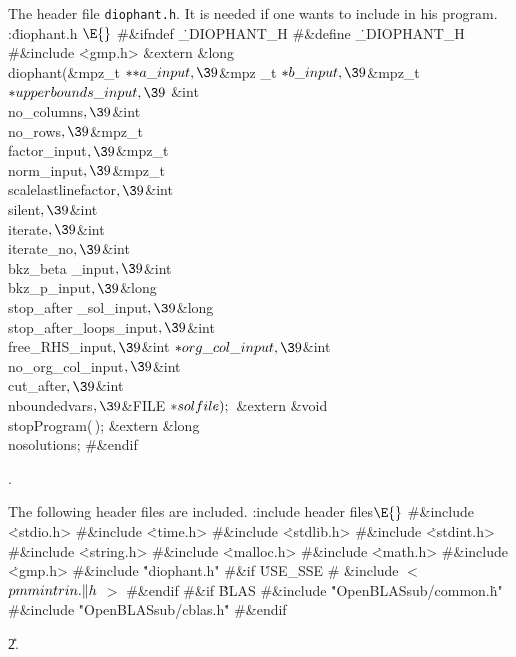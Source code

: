 The header file {\tt diophant.h}. It is needed if one wants to include
 in his program.
\Y\B\4:\.{diophant.h }\X${}\E{}$\6
\8\#\&{ifndef} \.{\_DIOPHANT\_H}\6
\8\#\&{define} \.{\_DIOPHANT\_H}\6
\8\#\&{include} \.{<gmp.h>}\6
\&{extern} \&{long} \\{diophant}(\&{mpz\_t} ${}{*}{*}\\{a\_input},\39{}$\&{mpz%
\_t} ${}{*}\\{b\_input},\39{}$\&{mpz\_t} ${}{*}\\{upperbounds\_input},\39{}$%
\&{int} \\{no\_columns}${},\39{}$\&{int} \\{no\_rows}${},\39{}$\&{mpz\_t} %
\\{factor\_input}${},\39{}$\&{mpz\_t} \\{norm\_input}${},\39{}$\&{mpz\_t} %
\\{scalelastlinefactor}${},\39{}$\&{int} \\{silent}${},\39{}$\&{int} %
\\{iterate}${},\39{}$\&{int} \\{iterate\_no}${},\39{}$\&{int} \\{bkz\_beta%
\_input}${},\39{}$\&{int} \\{bkz\_p\_input}${},\39{}$\&{long} \\{stop\_after%
\_sol\_input}${},\39{}$\&{long} \\{stop\_after\_loops\_input}${},\39{}$\&{int} %
\\{free\_RHS\_input}${},\39{}$\&{int} ${}{*}\\{org\_col\_input},\39{}$\&{int} %
\\{no\_org\_col\_input}${},\39{}$\&{int} \\{cut\_after}${},\39{}$\&{int} %
\\{nboundedvars}${},\39{}$\&{FILE} ${}{*}\\{solfile});{}$\6
\&{extern} \&{void} \\{stopProgram}(\,);\6
\&{extern} \&{long} \\{nosolutions};\6
\8\#\&{endif}\par
{}.\fi

The following header files are included.
\Y\B\4:include header files\X${}\E{}$\6
\8\#\&{include} \.{<stdio.h>}\6
\8\#\&{include} \.{<time.h>}\6
\8\#\&{include} \.{<stdlib.h>}\6
\8\#\&{include} \.{<stdint.h>}\6
\8\#\&{include} \.{<string.h>}\6
\8\#\&{include} \.{<malloc.h>}\6
\8\#\&{include} \.{<math.h>}\6
\8\#\&{include} \.{<gmp.h>}\6
\8\#\&{include} \.{"diophant.h"}\6
\8\#\&{if} \.{USE\_SSE}\6
$\#$ \&{include} $<$ $\\{pmmintrin}.\|h$ $>{}$\6
\8\#\&{endif}\6
\8\#\&{if} \.{BLAS}\6
\8\#\&{include} \.{"OpenBLASsub/common.}\)\.{h"}\6
\8\#\&{include} \.{"OpenBLASsub/cblas.h}\)\.{"}\6
\8\#\&{endif}\par
\U2.\fi

